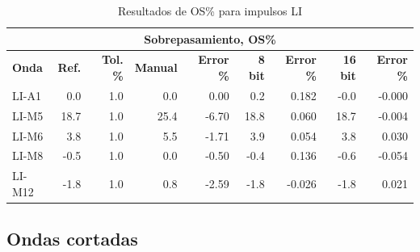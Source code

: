 \begin{table}[H]
    \centering
    \begin{tabular}{@{}lrrrrrrrr@{}}
        \toprule
        \multicolumn{9}{c}{\textbf{Sobrepasamiento, OS\%}}                                                                                                                \\ \midrule
        \textbf{Onda} & \textbf{Ref.} & \textbf{Tol. \%} & \textbf{Manual} & \textbf{Error \%} & \textbf{8 bit} & \textbf{Error \%} & \textbf{16 bit} & \textbf{Error \%} \\ \midrule
        LI-A1         & 0.0           & 1.0              & 0.0             & 0.00              & 0.2            & 0.182             & -0.0            & -0.000            \\ \midrule
        LI-M5         & 18.7          & 1.0              & 25.4            & -6.70             & 18.8           & 0.060             & 18.7            & -0.004            \\ \midrule
        LI-M6         & 3.8           & 1.0              & 5.5             & -1.71             & 3.9            & 0.054             & 3.8             & 0.030             \\ \midrule
        LI-M8         & -0.5          & 1.0              & 0.0             & -0.50             & -0.4           & 0.136             & -0.6            & -0.054            \\ \midrule
        LI-M12        & -1.8          & 1.0              & 0.8             & -2.59             & -1.8           & -0.026            & -1.8            & 0.021             \\ \bottomrule
    \end{tabular}
    \caption{Resultados de OS\% para impulsos LI}
    \label{tab:resultados_os_li}
\end{table}


\subsection{Ondas cortadas}
\label{subsec:precision_onda_cortadas}


